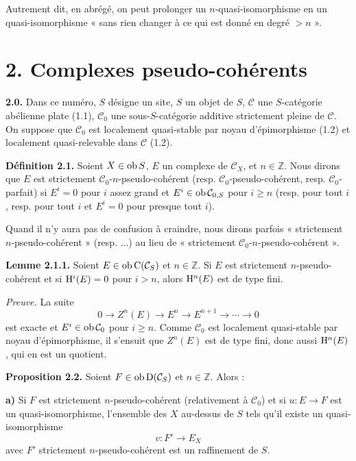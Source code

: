 \documentclass[11pt]{article}
\begin{document}
Autrement dit, en abrégé, on peut prolonger un \(n\)-quasi-isomorphisme en un quasi-isomorphisme « sans rien changer à ce qui est donné en degré \(>n\) ».

\section*{2. Complexes pseudo-cohérents}

\textbf{2.0.} Dans ce numéro, \(S\) désigne un site, \(S\) un objet de \(S\), \(\mathcal C\) une \(S\)-catégorie abélienne plate (1.1), \(\mathcal C_0\) une sous-\(S\)-catégorie additive strictement pleine de \(\mathcal C\). On suppose que \(\mathcal C_0\) est localement quasi-stable par noyau d'épimorphisme (1.2) et localement quasi-relevable dans \(\mathcal C\) (1.2).

\textbf{Définition 2.1.} Soient \(X\in\operatorname{ob} S\), \(E\) un complexe de \(\mathcal C_X\), et \(n\in\mathbb Z\). Nous dirons que \(E\) est strictement \(\mathcal C_0\)-\(n\)-pseudo-cohérent (resp. \(\mathcal C_0\)-pseudo-cohérent, resp. \(\mathcal C_0\)-parfait) si \(E^i=0\) pour \(i\) assez grand et \(E^i\in\operatorname{ob}\mathcal C_{0,S}\) pour \(i\geq n\) (resp. pour tout \(i\), resp. pour tout \(i\) et \(E^i=0\) pour presque tout \(i\)).

Quand il n'y aura pas de confusion à craindre, nous dirons parfois « strictement \(n\)-pseudo-cohérent » (resp. ...) au lieu de « strictement \(\mathcal C_0\)-\(n\)-pseudo-cohérent ».

\textbf{Lemme 2.1.1.} Soient \(E\in\operatorname{ob}\mathrm C(\mathcal C_S)\) et \(n\in\mathbb Z\). Si \(E\) est strictement \(n\)-pseudo-cohérent et si \(\mathrm H^i(E)=0\) pour \(i>n\), alors \(\mathrm H^n(E)\) est de type fini.

\emph{Preuve.} La suite
\[
  0\longrightarrow Z^n(E)\longrightarrow E^n\longrightarrow E^{n+1}\longrightarrow\cdots\longrightarrow 0
\]
est exacte et \(E^i\in\operatorname{ob}\mathcal C_0\) pour \(i\geq n\). Comme \(\mathcal C_0\) est localement quasi-stable par noyau d'épimorphisme, il s'ensuit que \(Z^n(E)\) est de type fini, donc aussi \(\mathrm H^n(E)\), qui en est un quotient.

\textbf{Proposition 2.2.} Soient \(F\in\operatorname{ob}\mathrm D(\mathcal C_S)\) et \(n\in\mathbb Z\). Alors :

\textbf{a)} Si \(F\) est strictement \(n\)-pseudo-cohérent (relativement à \(\mathcal C_0\)) et si \(u:E\to F\) est un quasi-isomorphisme, l'ensemble des \(X\) au-dessus de \(S\) tels qu'il existe un quasi-isomorphisme
\[
  v:F'\longrightarrow E_X
\]
avec \(F'\) strictement \(n\)-pseudo-cohérent est un raffinement de \(S\).
\end{document}
